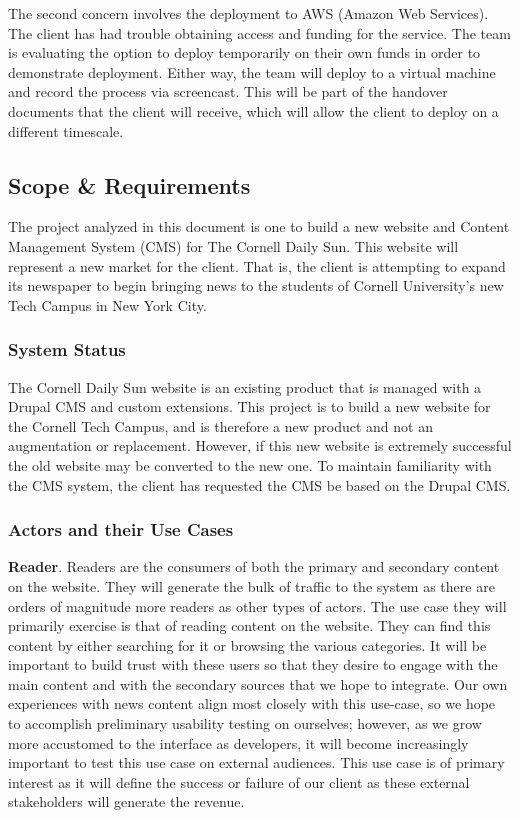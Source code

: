\documentclass[11pt]{article} %
\begin{document}
The second concern involves the deployment to AWS (Amazon Web Services). The client has had trouble obtaining access and funding for the service. The team is evaluating the option to deploy temporarily on their own funds in order to demonstrate deployment. Either way, the team will deploy to a virtual machine and record the process via screencast. This will be part of the handover documents that the client will receive, which will allow the client to deploy on a different timescale.

\subsection{Scope \& Requirements}

The project analyzed in this document is one to build a new website and Content Management System (CMS) for The Cornell Daily Sun. This website will represent a new market for the client. That is, the client is attempting to expand its newspaper to begin bringing news to the students of Cornell University’s new Tech Campus in New York City.
                   
\subsubsection{System Status}
                   
The Cornell Daily Sun website is an existing product that is managed with a Drupal CMS and custom extensions. This project is to build a new website for the Cornell Tech Campus, and is therefore a new product and not an augmentation or replacement. However, if this new website is extremely successful the old website may be converted to the new one. To maintain familiarity with the CMS system, the client has requested the CMS be based on the Drupal CMS.

\subsubsection{Actors and their Use Cases}

\textbf{Reader}. Readers are the consumers of both the primary and secondary content on the website. They will generate the bulk of traffic to the system as there are orders of magnitude more readers as other types of actors. The use case they will primarily exercise is that of reading content on the website. They can find this content by either searching for it or browsing the various categories. It will be important to build trust with these users so that they desire to engage with the main content and with the secondary sources that we hope to integrate. Our own experiences with news content align most closely with this use-case, so we hope to accomplish preliminary usability testing on ourselves; however, as we grow more accustomed to the interface as developers, it will become increasingly important to test this use case on external audiences. This use case is of primary interest as it will define the success or failure of our client as these external stakeholders will generate the revenue.
\end{document}
